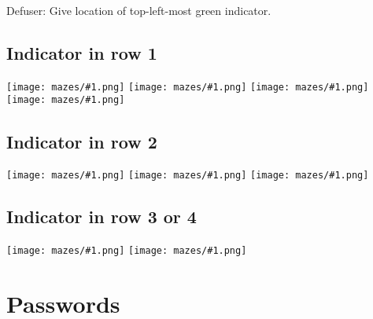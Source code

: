 \documentclass[11pt]{amsart}
\newcommand{\Maze}[1]{\texttt{[image: mazes/\#1.png]}}
\begin{document}
Defuser: Give location of top-left-most green indicator.

\subsection{Indicator in row 1}
\Maze{11} \Maze{12} \Maze{14} \Maze{15}

\subsection{Indicator in row 2}
\Maze{21} \Maze{23} \Maze{25}

\subsection{Indicator in row 3 or 4}
\Maze{35} \Maze{44}




\section{Passwords}
\end{document}

